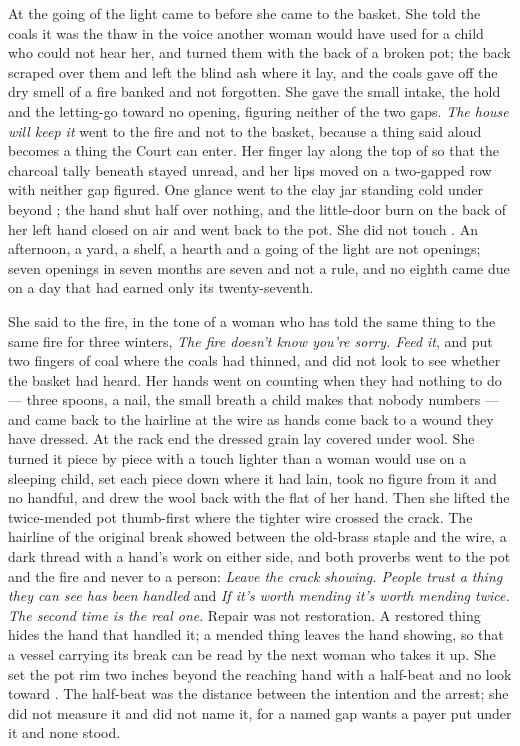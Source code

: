 \scenebreak

At the going of the light  came to  before she came to the basket. She told the coals it was the thaw in the voice another woman would have used for a child who could not hear her, and turned them with the back of a broken pot; the back scraped over them and left the blind ash where it lay, and the coals gave off the dry smell of a fire banked and not forgotten. She gave the small intake, the hold and the letting-go toward no opening, figuring neither of the two gaps. \emph{The house will keep it} went to the fire and not to the basket, because a thing said aloud becomes a thing the Court can enter. Her finger lay along the top of  so that the charcoal tally beneath stayed unread, and her lips moved on a two-gapped row with neither gap figured. One glance went to the clay jar standing cold under  beyond ; the hand shut half over nothing, and the little-door burn on the back of her left hand closed on air and went back to the pot. She did not touch . An afternoon, a yard, a shelf, a hearth and a going of the light are not openings; seven openings in seven months are seven and not a rule, and no eighth came due on a day that had earned only its twenty-seventh.

She said to the fire, in the tone of a woman who has told the same thing to the same fire for three winters, \emph{The fire doesn't know you're sorry. Feed it}, and put two fingers of coal where the coals had thinned, and did not look to see whether the basket had heard. Her hands went on counting when they had nothing to do --- three spoons, a nail, the small breath a child makes that nobody numbers --- and came back to the hairline at the wire as hands come back to a wound they have dressed. At the rack end the dressed grain lay covered under wool. She turned it piece by piece with a touch lighter than a woman would use on a sleeping child, set each piece down where it had lain, took no figure from it and no handful, and drew the wool back with the flat of her hand. Then she lifted the twice-mended pot thumb-first where the tighter wire crossed the crack. The hairline of the original break showed between the old-brass staple and the wire, a dark thread with a hand's work on either side, and both proverbs went to the pot and the fire and never to a person: \emph{Leave the crack showing. People trust a thing they can see has been handled} and \emph{If it's worth mending it's worth mending twice. The second time is the real one}. Repair was not restoration. A restored thing hides the hand that handled it; a mended thing leaves the hand showing, so that a vessel carrying its break can be read by the next woman who takes it up. She set the pot rim two inches beyond the reaching hand with a half-beat and no look toward . The half-beat was the distance between the intention and the arrest; she did not measure it and did not name it, for a named gap wants a payer put under it and none stood.

